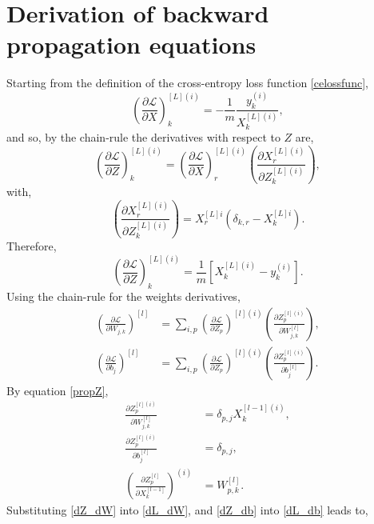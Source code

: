 \documentclass[11pt,twocolumn]{article}
\begin{document}
\section{Derivation of backward propagation equations}\label{backprop_derive}
Starting from the definition of the cross-entropy loss function \ref{celossfunc}, 
\begin{equation}
\left(\frac{\partial \mathcal{L}}{\partial X}\right)^{[L](i)}_k=-\frac{1}{m}\frac{y^{(i)}_k}{X^{[L](i)}_k},\nonumber
\end{equation}
and so, by the chain-rule the derivatives with respect to $Z$ are,
\begin{equation}
\left(\frac{\partial \mathcal{L}}{\partial Z}\right)^{[L](i)}_k=\left(\frac{\partial \mathcal{L}}{\partial X}\right)^{[L](i)}_r \left(\frac{\partial X^{[L](i)}_r}{\partial Z^{[L](i)}_k}\right),\nonumber
\end{equation}
with,
\begin{equation}
\left(\frac{\partial X^{[L](i)}_r}{\partial Z^{[L](i)}_k}\right)=X_{r}^{[L]i}(\delta_{k,r} - X_{k}^{[L]i}).\nonumber
\end{equation}
Therefore,
\begin{equation}
\left(\frac{\partial \mathcal{L}}{\partial Z}\right)^{[L](i)}_k=\frac{1}{m}\left[X^{[L](i)}_k-y^{(i)}_k\right].\nonumber
\end{equation}
Using the chain-rule for the weights derivatives,
\begin{align}
\left(\frac{\partial \mathcal{L}}{\partial W_{j,k}}\right)^{[l]}&=\sum_{i,p}\left(\frac{\partial \mathcal{L}}{\partial Z_{p}}\right)^{[l](i)}\left(\frac{\partial Z_{p}^{[l](i)}}{\partial W_{j,k}^{[l]}}\right),\label{dL_dW}\\
\left(\frac{\partial \mathcal{L}}{\partial b_{j}}\right)^{[l]}&=\sum_{i,p}\left(\frac{\partial \mathcal{L}}{\partial Z_{p}}\right)^{[l](i)}\left(\frac{\partial Z_{p}^{[l](i)}}{\partial b_{j}^{[l]}}\right).\label{dL_db}
\end{align}
By equation \ref{propZ},
\begin{align}
\frac{\partial Z_{p}^{[l](i)}}{\partial W_{j,k}^{[l]}}&=\delta_{p,j}X_{k}^{[l-1](i)},\label{dZ_dW}\\
\frac{\partial Z_{p}^{[l](i)}}{\partial b_{j}^{[l]}}&=\delta_{p,j},\label{dZ_db}\\
\left(\frac{\partial Z_{p}^{[l]}}{\partial X_{k}^{[l-1]}}\right)^{(i)}&=W_{p,k}^{[l]}.\label{dZ_dX}
\end{align}
Substituting \ref{dZ_dW} into \ref{dL_dW}, and \ref{dZ_db} into \ref{dL_db} leads to,
\end{document}
